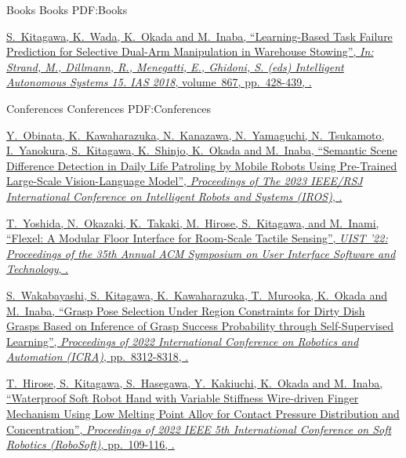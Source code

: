 \documentclass[letterpaper,MMMyyyy,nonstopmode]{simpleresumecv}
\begin{document}
\begin{Body}
\endgroup

\BigGap
\SubSection
{Books}
{Books}
{PDF:Books}

\begingroup

\BulletItem
\href{https://doi.org/10.1007/978-3-030-01370-7_34}
{\underline{S.~Kitagawa}, K.~Wada, K.~Okada and M.~Inaba,
``Learning-Based Task Failure Prediction for Selective Dual-Arm Manipulation in Warehouse Stowing'',
\textit{In: Strand, M., Dillmann, R., Menegatti, E., Ghidoni, S. (eds) Intelligent Autonomous Systems 15. IAS 2018},
volume~867,
pp.~428-439,
.}

\endgroup

\BigGap
\SubSection
{Conferences}
{Conferences}
{PDF:Conferences}

\begingroup

\BulletItem
\href{https://doi.org/10.1109/IROS55552.2023.10342467}
{Y.~Obinata, K.~Kawaharazuka, N.~Kanazawa, N.~Yamaguchi, N.~Tsukamoto, I.~Yanokura, \underline{S.~Kitagawa}, K.~Shinjo, K.~Okada and M.~Inaba,
``Semantic Scene Difference Detection in Daily Life Patroling by Mobile Robots Using Pre-Trained Large-Scale Vision-Language Model'',
\textit{Proceedings of The 2023 IEEE/RSJ International Conference on Intelligent Robots and Systems (IROS)},
.}

\BulletItem
\href{https://doi.org/10.1145/3526113.3545699}
{T.~Yoshida, N.~Okazaki, K.~Takaki, M.~Hirose, \underline{S.~Kitagawa}, and M.~Inami,
``Flexel: A Modular Floor Interface for Room-Scale Tactile Sensing'',
\textit{UIST '22: Proceedings of the 35th Annual ACM Symposium on User Interface Software and Technology},
.}

\BulletItem
\href{https://doi.org/10.1109/ICRA46639.2022.9812084}
{S.~Wakabayashi, \underline{S.~Kitagawa}, K.~Kawaharazuka, T.~Murooka, K.~Okada and M.~Inaba,
``Grasp Pose Selection Under Region Constraints for Dirty Dish Grasps Based on Inference of Grasp Success Probability through Self-Supervised Learning'',
\textit{Proceedings of 2022 International Conference on Robotics and Automation (ICRA)},
pp.~8312-8318,
.}

\BulletItem
\href{https://doi.org/10.1109/RoboSoft54090.2022.9762208}
{T.~Hirose, \underline{S.~Kitagawa}, S.~Hasegawa, Y.~Kakiuchi, K.~Okada and M.~Inaba,
``Waterproof Soft Robot Hand with Variable Stiffness Wire-driven Finger Mechanism Using Low Melting Point Alloy for Contact Pressure Distribution and Concentration'',
\textit{Proceedings of 2022 IEEE 5th International Conference on Soft Robotics (RoboSoft)},
pp.~109-116,
.}


\end{Body}
\end{document}

